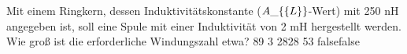     {Mit einem Ringkern, dessen Induktivitätskonstante ($A\_\{\textrm\{L\}\}$-Wert) mit 250 nH angegeben ist, soll eine Spule mit einer Induktivität von 2 mH hergestellt werden. Wie groß ist die erforderliche Windungszahl etwa?}
    {89}
    {3}
    {2828}
    {53}
    {false}{false}